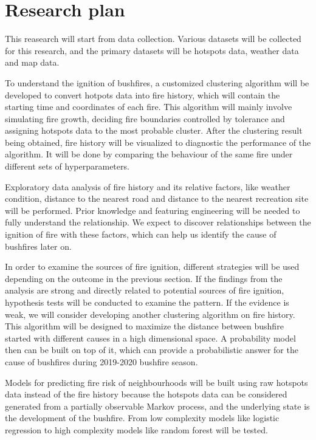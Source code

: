 \documentclass{monashthesis}
\begin{document}
\section{Research plan}\label{research-plan}

This reasearch will start from data collection. Various datasets will be
collected for this research, and the primary datasets will be hotspots
data, weather data and map data.

To understand the ignition of bushfires, a customized clustering
algorithm will be developed to convert hotpots data into fire history,
which will contain the starting time and coordinates of each fire. This
algorithm will mainly involve simulating fire growth, deciding fire
boundaries controlled by tolerance and assigning hotspots data to the
most probable cluster. After the clustering result being obtained, fire
history will be visualized to diagnostic the performance of the
algorithm. It will be done by comparing the behaviour of the same fire
under different sets of hyperparameters.

Exploratory data analysis of fire history and its relative factors, like
weather condition, distance to the nearest road and distance to the
nearest recreation site will be performed. Prior knowledge and featuring
engineering will be needed to fully understand the relationship. We
expect to discover relationships between the ignition of fire with these
factors, which can help us identify the cause of bushfires later on.

In order to examine the sources of fire ignition, different strategies
will be used depending on the outcome in the previous section. If the
findings from the analysis are strong and directly related to potential
sources of fire ignition, hypothesis tests will be conducted to examine
the pattern. If the evidence is weak, we will consider developing
another clustering algorithm on fire history. This algorithm will be
designed to maximize the distance between bushfire started with
different causes in a high dimensional space. A probability model then
can be built on top of it, which can provide a probabilistic answer for
the cause of bushfires during 2019-2020 bushfire season.

Models for predicting fire risk of neighbourhoods will be built using
raw hotspots data instead of the fire history because the hotspots data
can be considered generated from a partially observable Markov process,
and the underlying state is the development of the bushfire. From low
complexity models like logistic regression to high complexity models
like random forest will be tested.
\end{document}
